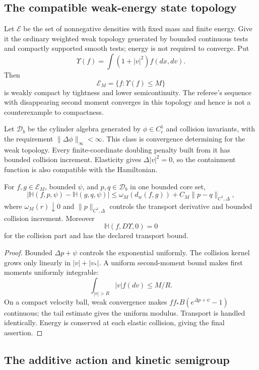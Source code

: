 \subsection{The compatible weak-energy state topology}

Let \(\mathcal E\) be the set of nonnegative densities with fixed mass and
finite energy.  Give it the ordinary weighted weak topology generated by
bounded continuous tests and compactly supported smooth tests; energy is not
required to converge.  Put
\[
\Upsilon(f)=\int(1+|v|^2)f(dx,dv).
\]
Then
\[
\mathcal E_M=\{f:\Upsilon(f)\le M\}
\]
is weakly compact by tightness and lower semicontinuity.  The referee's
sequence with disappearing second moment converges in this topology and hence
is not a counterexample to compactness.

Let \(\mathscr D_b\) be the cylinder algebra generated by
\(\phi\in C_c^1\) and collision invariants, with the requirement
\(\|\Delta\phi\|_\infty<\infty\).  This class is convergence determining for
the weak topology.  Every finite-coordinate doubling penalty built from it
has bounded collision increment.  Elasticity gives
\(\Delta|v|^2=0\), so the containment function is also compatible with the
Hamiltonian.

\begin{lemma}
\label{lem:r6-b4-hamiltonian}
For \(f,g\in\mathcal E_M\), bounded \(\psi\), and
\(p,q\in\mathscr D_b\) in one bounded core set,
\[
|\mathbb H(f,p,\psi)-\mathbb H(g,q,\psi)|
\le\omega_M(d_w(f,g))+
C_M\|p-q\|_{C^1,\Delta},
\]
where \(\omega_M(r)\downarrow0\) and
\(\|p\|_{C^1,\Delta}\) controls the transport derivative and bounded collision
increment.  Moreover
\[
\mathbb H(f,D\Upsilon,0)=0
\]
for the collision part and has the declared transport bound.
\end{lemma}

\begin{proof}
Bounded \(\Delta p+\psi\) controls the exponential uniformly.  The collision
kernel grows only linearly in \(|v|+|v_*|\).  A uniform second-moment bound
makes first moments uniformly integrable:
\[
\int_{|v|>R}|v|f(dv)\le M/R.
\]
On a compact velocity ball, weak convergence makes
\(ff_*B(e^{\Delta p+\psi}-1)\) continuous; the tail estimate gives the
uniform modulus.  Transport is handled identically.  Energy is conserved at
each elastic collision, giving the final assertion.
\end{proof}

\subsection{The additive action and kinetic semigroup}

